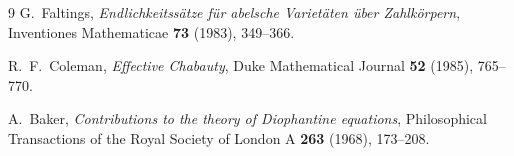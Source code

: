\documentclass[12pt,a4paper]{article}
\theoremstyle{remark}
\begin{document}
\begin{thebibliography}{9}
  G.~Faltings,
  \textit{Endlichkeitss\"atze f\"ur abelsche Variet\"aten \"uber Zahlk\"orpern},
  Inventiones Mathematicae \textbf{73} (1983), 349--366.

  R.~F.~Coleman,
  \textit{Effective Chabauty},
  Duke Mathematical Journal \textbf{52} (1985), 765--770.

  A.~Baker,
  \textit{Contributions to the theory of Diophantine equations},
  Philosophical Transactions of the Royal Society of London A \textbf{263} (1968), 173--208.
\end{thebibliography}
\end{document}
